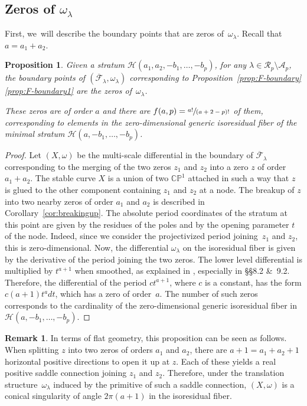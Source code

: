 \documentclass[11pt]{article}
\newtheorem{prop}[thm]{Proposition}
\theoremstyle{definition}
\newtheorem{rmk}[thm]{Remark}
\begin{document}
\subsection{Zeros of $\omega_{\lambda}$}\label{subsub:zeros}

First, we~will describe the boundary points that are zeros of~$\omega_{\lambda}$. Recall that $a=a_{1}+a_{2}$.
\begin{prop}\label{prop:zeros}
Given a stratum $\mathcal{H}(a_{1},a_{2},-b_{1},\dots,-b_{p})$, for any $\lambda \in \mathcal{R}_{p} \setminus \mathcal{A}_{p}$, the boundary points of $(\overline{\mathcal{F}}_{\lambda}, \omega_\lambda)$ corresponding to Proposition~\ref{prop:F-boundary}\eqref{prop:F-boundary1} are the zeros of~$\omega_{\lambda}$.

These zeros are of order $a$ and there are $f(a,p)=\sfrac{a!}{(a+2-p)!}$ of them, corresponding to elements in the zero-dimensional generic isoresidual fiber of the minimal stratum $\mathcal{H}(a,-b_{1},\dots,-b_{p})$.
\end{prop}

\begin{proof}
Let $(X,\omega)$ be the multi-scale differential in the boundary of $\overline{\mathcal F}_\lambda$ corresponding to the merging of the two zeros $z_1$ and $z_2$ into a zero $z$ of order $a_1 + a_2$. The stable curve $X$ is a union of two $\mathbb{CP}^1$ attached in such a way that $z$ is glued to the other component containing $z_1$ and $z_2$ at a node. The breakup of $z$ into two nearby zeros of order $a_1$ and $a_2$ is described in Corollary~\ref{cor:breakingup}. The absolute period coordinates of the stratum at this point are given by the residues of the poles and by the opening parameter $t$ of the node. Indeed, since we consider the projectivized period joining~$z_{1}$ and $z_{2}$, this is zero-dimensional. Now, the differential $\omega_{\lambda}$ on the isoresidual fiber is given by the derivative of the period joining the two zeros. The lower level differential is multiplied by $t^{a+1}$ when smoothed, as explained in \cite{BCGGM2}, especially in \S\S 8.2 \&~9.2. Therefore, the differential of the period $ct^{a+1}$, where $c$ is a constant, has the form $c(a+1)t^{a}dt$, which has a zero of order~$a$. The number of such zeros corresponds to the cardinality of the zero-dimensional generic isoresidual fiber in $\mathcal{H}(a,-b_{1},\dots,-b_{p})$.
\end{proof}

\begin{rmk}
In terms of flat geometry, this proposition can be seen as follows. When splitting $z$ into two zeros of orders $a_{1}$ and $a_{2}$, there are $a +1 = a_1 + a_2 + 1$ horizontal positive directions to open it up at $z$. Each of these yields a real positive saddle connection joining $z_1$ and $z_2$. Therefore, under the translation structure~$\omega_\lambda$ induced by the primitive of such a saddle connection, $(X,\omega)$ is a conical singularity of angle $2\pi (a+1)$ in the isoresidual fiber.
\end{rmk}
\end{document}
